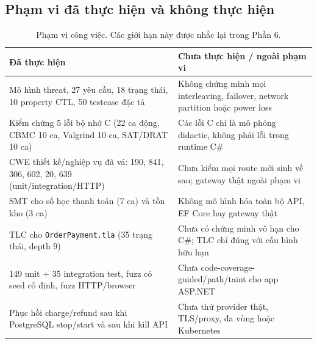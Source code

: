 \documentclass[12pt,a4paper]{article}
\begin{document}
\subsection{Phạm vi đã thực hiện và không thực hiện}
\begin{table}[H]
\centering
\small
\renewcommand{\arraystretch}{1.25}
\begin{tabularx}{\textwidth}{@{}L{4.6cm} Y@{}}
\toprule
\textbf{Đã thực hiện} & \textbf{Chưa thực hiện / ngoài phạm vi} \\
\midrule
Mô hình threat, 27 yêu cầu, 18 trạng thái, 10 property CTL, 50 testcase đặc tả &
Không chứng minh mọi interleaving, failover, network partition hoặc power loss \\
Kiểm chứng 5 lỗi bộ nhớ C (22 ca động, CBMC 10 ca, Valgrind 10 ca, SAT/DRAT 10 ca) &
Các lỗi C chỉ là mô phỏng didactic, không phải lỗi trong runtime C\# \\
 CWE thiết kế/nghiệp vụ đã vá: 190, 841, 306, 602, 20, 639 (unit/integration/HTTP) &
Chưa kiểm mọi route mới sinh về sau; gateway thật ngoài phạm vi \\
SMT cho số học thanh toán (7 ca) và tồn kho (3 ca) &
Không mô hình hóa toàn bộ API, EF Core hay gateway thật \\
TLC cho \texttt{OrderPayment.tla} (35 trạng thái, depth 9) &
Chưa có chứng minh vô hạn cho C\#; TLC chỉ đúng với cấu hình hữu hạn \\
149 unit + 35 integration test, fuzz có seed cố định, fuzz HTTP/browser &
Chưa code-coverage-guided/path/taint cho app ASP.NET \\
Phục hồi charge/refund sau khi PostgreSQL stop/start và sau khi kill API &
Chưa thử provider thật, TLS/proxy, đa vùng hoặc Kubernetes \\
\bottomrule
\end{tabularx}
\caption{Phạm vi công việc. Các giới hạn này được nhắc lại trong Phần 6.}
\end{table}
\end{document}
